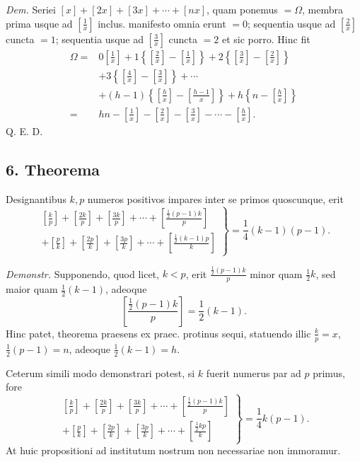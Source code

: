 \documentclass[12pt]{article}
\begin{document}
\emph{Dem.} Seriei $[x]+[2x]+[3x]+\cdots+[nx]$, quam ponemus $=\Omega$, membra prima usque ad $\left[\frac1x\right]$ inclus. manifesto omnia erunt $=0$; sequentia usque ad $\left[\frac2x\right]$ cuncta $=1$; sequentia usque ad $\left[\frac3x\right]$ cuncta $=2$ et sic porro. Hinc fit
\[
\begin{aligned}
\Omega={}&0\left[\frac1x\right]
+1\left\{\left[\frac2x\right]-\left[\frac1x\right]\right\}
+2\left\{\left[\frac3x\right]-\left[\frac2x\right]\right\}\\
&+3\left\{\left[\frac4x\right]-\left[\frac3x\right]\right\}+\cdots\\
&+(h-1)\left\{\left[\frac hx\right]-\left[\frac{h-1}{x}\right]\right\}
+h\left\{n-\left[\frac hx\right]\right\}\\
={}&hn-\left[\frac1x\right]-\left[\frac2x\right]-\left[\frac3x\right]-\cdots-\left[\frac hx\right].
\end{aligned}
\]
Q. E. D.

\subsection*{6. Theorema}

Designantibus $k,p$ numeros positivos impares inter se primos quoscunque, erit
\[
\left.
\begin{array}{l}
\left[\frac{k}{p}\right]+\left[\frac{2k}{p}\right]+\left[\frac{3k}{p}\right]+\cdots+\left[\frac{\frac12(p-1)k}{p}\right]\\
+\left[\frac{p}{k}\right]+\left[\frac{2p}{k}\right]+\left[\frac{3p}{k}\right]+\cdots+\left[\frac{\frac12(k-1)p}{k}\right]
\end{array}
\right\}
=\frac14(k-1)(p-1).
\]

\emph{Demonstr.} Supponendo, quod licet, $k<p$, erit $\frac{\frac12(p-1)k}{p}$ minor quam $\frac12k$, sed maior quam $\frac12(k-1)$, adeoque
\[
\left[\frac{\frac12(p-1)k}{p}\right]=\frac12(k-1).
\]
Hinc patet, theorema praesens ex praec. protinus sequi, statuendo illic $\frac{k}{p}=x$, $\frac12(p-1)=n$, adeoque $\frac12(k-1)=h$.

Ceterum simili modo demonstrari potest, si $k$ fuerit numerus par ad $p$ primus, fore
\[
\left.
\begin{array}{l}
\left[\frac{k}{p}\right]+\left[\frac{2k}{p}\right]+\left[\frac{3k}{p}\right]+\cdots+\left[\frac{\frac12(p-1)k}{p}\right]\\
+\left[\frac{p}{k}\right]+\left[\frac{2p}{k}\right]+\left[\frac{3p}{k}\right]+\cdots+\left[\frac{\frac12 kp}{k}\right]
\end{array}
\right\}
=\frac14k(p-1).
\]
At huic propositioni ad institutum nostrum non necessariae non immoramur.
\end{document}
